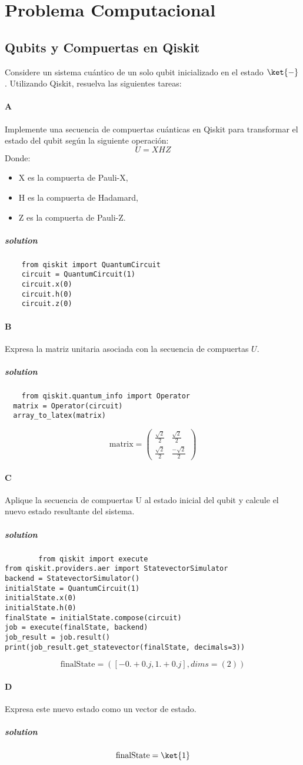 \section{Problema Computacional}
\subsection{Qubits y Compuertas en Qiskit}
Considere un sistema cuántico de un solo qubit inicializado en el estado $\ket{-}$.
Utilizando Qiskit, resuelva las siguientes tareas:

\paragraph{A} Implemente una secuencia de compuertas cuánticas en Qiskit para transformar el estado del qubit según la siguiente operación:
\[
U = X  H  Z
\]
Donde:
\begin{itemize}
\item X es la compuerta de Pauli-X,
\item H es la compuerta de Hadamard,
\item Z es la compuerta de Pauli-Z.
\end{itemize}

\subparagraph{solution}

	\begin{verbatim}
	from qiskit import QuantumCircuit
	circuit = QuantumCircuit(1)
	circuit.x(0)
	circuit.h(0)
	circuit.z(0)
	\end{verbatim}


\paragraph{B} Expresa la matriz unitaria asociada con la secuencia de compuertas $U$.
\subparagraph{solution}
	\begin{verbatim}
	from qiskit.quantum_info import Operator
  matrix = Operator(circuit)
  array_to_latex(matrix)
	\end{verbatim}
	\[
		\text{matrix} = \begin{pmatrix}\frac{\sqrt{2}}{2} & \frac{\sqrt{2}}{2} \\ \frac{\sqrt{2}}{2} & \frac{-\sqrt{2}}{2}
		\end{pmatrix}
	\]


\paragraph{C} Aplique la secuencia de compuertas U al estado inicial del qubit y calcule el nuevo estado resultante del sistema.
\subparagraph{solution}
	\begin{verbatim}
		from qiskit import execute
from qiskit.providers.aer import StatevectorSimulator
backend = StatevectorSimulator()
initialState = QuantumCircuit(1)
initialState.x(0)
initialState.h(0)
finalState = initialState.compose(circuit)
job = execute(finalState, backend)
job_result = job.result()
print(job_result.get_statevector(finalState, decimals=3))
	\end{verbatim}
	\[
			\text{finalState} = ([-0.+0.j,  1.+0.j], dims=(2))
	\]


\paragraph{D} Expresa este nuevo estado como un vector de estado.
\subparagraph{solution}
	\[
			\text{finalState} = \ket{1}
	\]

